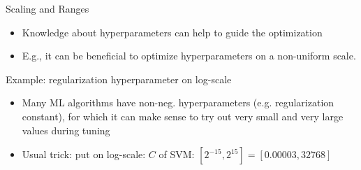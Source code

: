 
\subtitle{Example and Practical Hints}





\maketitle



\begin{frame}[allowframebreaks]{Scaling and Ranges}

\begin{itemize}
	\item Knowledge about hyperparameters can help to guide the optimization
	\item E.g., it can be beneficial to optimize hyperparameters on a non-uniform scale.
\end{itemize}

Example: regularization hyperparameter on log-scale

\begin{itemize}
    \item Many ML algorithms have non-neg. hyperparameters (e.g. regularization constant), for which it can make sense to try out very small and very large values during tuning
    \item Usual trick: put on log-scale: $C$ of SVM: $[2^{-15}, 2^{15}] = [0.00003, 32768]$
\end{itemize}

\begin{figure}[htb]
\centering


\end{figure}
\end{frame}
